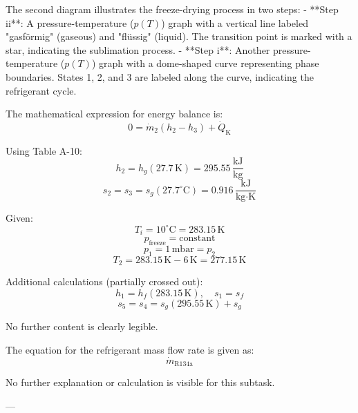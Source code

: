 The second diagram illustrates the freeze-drying process in two steps:  
- **Step ii**: A pressure-temperature (\( p(T) \)) graph with a vertical line labeled "gasförmig" (gaseous) and "flüssig" (liquid). The transition point is marked with a star, indicating the sublimation process.  
- **Step i**: Another pressure-temperature (\( p(T) \)) graph with a dome-shaped curve representing phase boundaries. States 1, 2, and 3 are labeled along the curve, indicating the refrigerant cycle.  

The mathematical expression for energy balance is:  
\[
0 = \dot{m}_2 (h_2 - h_3) + \dot{Q}_{\text{K}}
\]  

Using Table A-10:  
\[
h_2 = h_g(27.7 \, \text{K}) = 295.55 \, \frac{\text{kJ}}{\text{kg}}
\]  
\[
s_2 = s_3 = s_g(27.7^\circ\text{C}) = 0.916 \, \frac{\text{kJ}}{\text{kg·K}}
\]  

Given:  
\[
T_i = 10^\circ\text{C} = 283.15 \, \text{K}
\]  
\[
p_{\text{freeze}} = \text{constant}
\]  
\[
p_1 = 1 \, \text{mbar} = p_2
\]  
\[
T_2 = 283.15 \, \text{K} - 6 \, \text{K} = 277.15 \, \text{K}
\]  

Additional calculations (partially crossed out):  
\[
h_1 = h_f(283.15 \, \text{K}), \quad s_1 = s_f
\]  
\[
s_5 = s_4 = s_g(295.55 \, \text{K}) + s_g
\]  

No further content is clearly legible.

The equation for the refrigerant mass flow rate is given as:  
\[
\dot{m}_{\text{R134a}}
\]  

No further explanation or calculation is visible for this subtask.

---